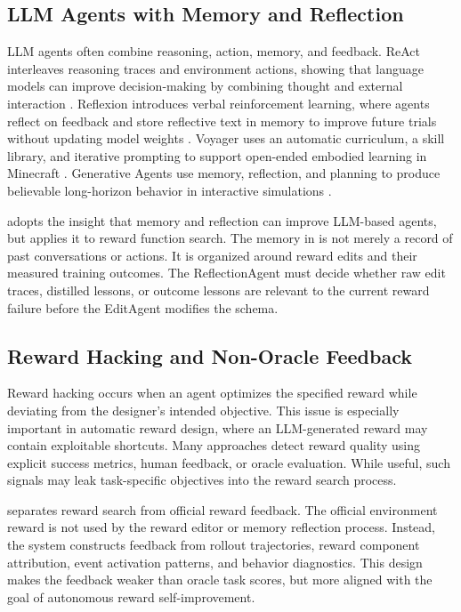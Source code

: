 \subsection{LLM Agents with Memory and Reflection}

LLM agents often combine reasoning, action, memory, and feedback. ReAct interleaves reasoning traces and environment actions, showing that language models can improve decision-making by combining thought and external interaction \cite{yao2022react}. Reflexion introduces verbal reinforcement learning, where agents reflect on feedback and store reflective text in memory to improve future trials without updating model weights \cite{shinn2023reflexion}. Voyager uses an automatic curriculum, a skill library, and iterative prompting to support open-ended embodied learning in Minecraft \cite{wang2023voyager}. Generative Agents use memory, reflection, and planning to produce believable long-horizon behavior in interactive simulations \cite{park2023generative}.

\methodname{} adopts the insight that memory and reflection can improve LLM-based agents, but applies it to reward function search. The memory in \methodname{} is not merely a record of past conversations or actions. It is organized around reward edits and their measured training outcomes. The ReflectionAgent must decide whether raw edit traces, distilled lessons, or outcome lessons are relevant to the current reward failure before the EditAgent modifies the schema.

\subsection{Reward Hacking and Non-Oracle Feedback}

Reward hacking occurs when an agent optimizes the specified reward while deviating from the designer's intended objective. This issue is especially important in automatic reward design, where an LLM-generated reward may contain exploitable shortcuts. Many approaches detect reward quality using explicit success metrics, human feedback, or oracle evaluation. While useful, such signals may leak task-specific objectives into the reward search process.

\methodname{} separates reward search from official reward feedback. The official environment reward is not used by the reward editor or memory reflection process. Instead, the system constructs feedback from rollout trajectories, reward component attribution, event activation patterns, and behavior diagnostics. This design makes the feedback weaker than oracle task scores, but more aligned with the goal of autonomous reward self-improvement.

